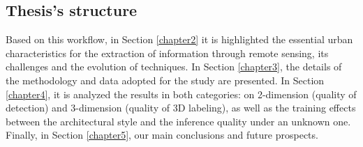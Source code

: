\subsection{Thesis's structure}
Based on this workflow, in Section \ref{chapter2} it is highlighted the essential urban characteristics for the extraction of information through remote sensing, its challenges and the evolution of techniques. In Section \ref{chapter3}, the details of the methodology and data adopted for the study are presented. In Section \ref{chapter4}, it is analyzed the results in both categories: on 2-dimension (quality of detection) and 3-dimension (quality of 3D labeling), as well as the training effects between the architectural style and the inference quality under an unknown one. Finally, in Section \ref{chapter5}, our main conclusions and future prospects.
